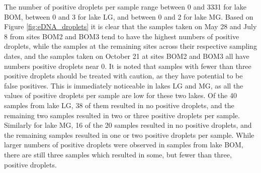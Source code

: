 \documentclass[12pt]{article}\usepackage[]{graphicx}\usepackage[]{color}
\newenvironment{knitrout}{}{} %
\newenvironment{knitrout}{}{} %
\begin{document}
\begin{knitrout}
\color{fgcolor}\begin{table}[!h]

\caption{\label{tab:eDNA_table}\label{tab:eDNA_data}
             10 sample rows of the eDNA data.}
\centering
{}
\end{table}


\end{knitrout}



The number of positive droplets per sample range between 0 and 3331 for lake BOM, between 0 and 3 for lake LG, and between 0 and 2 for lake MG. Based on Figure \ref{fig:eDNA_droplets} it is clear that the samples taken on May 28 and July 8 from sites BOM2 and BOM3 tend to have the highest numbers of positive droplets, while the samples at the remaining sites across their respective sampling dates, and the samples taken on October 21 at sites BOM2 and BOM3 all have numbers positive droplets near 0. It is noted that samples with fewer than three positive droplets should be treated with caution, as they have potential to be false positives. This is immediately noticeable in lakes LG and MG, as all the values of positive droplets per sample are low for these two lakes. Of the 40 samples from lake LG, 38 of them resulted in no positive droplets, and the remaining two samples resulted in two or three positive droplets per sample. Similarly for lake MG, 16 of the 20 samples resulted in no positive droplets, and the remaining samples resulted in one or two positive droplets per sample. While larger numbers of positive droplets were observed in samples from lake BOM, there are still three samples which resulted in some, but fewer than three, positive droplets. 
\end{document}
